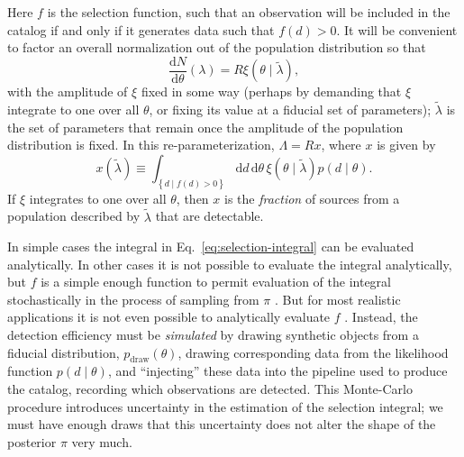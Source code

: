 \documentclass[modern]{aastex62}
\newcommand{\dd}{\mathrm{d}}
\newcommand{\diff}[2]{\frac{\dd #1}{\dd #2}}
\newcommand{\pdraw}{p_\mathrm{draw}}
\begin{document}
%
Here $f$ is the selection function, such that an observation will be included in
the catalog if and only if it generates data such that $f(d) > 0$.  It will be
convenient to factor an overall normalization out of the population distribution
so that
%
\begin{equation}
  \diff{N}{\theta}\left( \lambda \right) = R \xi\left( \theta \mid \tilde{\lambda} \right),
\end{equation}
%
with the amplitude of $\xi$ fixed in some way (perhaps by demanding that $\xi$
integrate to one over all $\theta$, or fixing its value at a fiducial set of
parameters); $\tilde{\lambda}$ is the set of parameters that remain once the
amplitude of the population distribution is fixed.  In this re-parameterization,
$\Lambda = R x$, where $x$ is given by
%
\begin{equation}
  \label{eq:selection-integral}
  x\left( \tilde{\lambda} \right) \equiv \int_{\left\{ d \mid f(d) > 0 \right\}} \dd d \, \dd \theta \, \xi\left( \theta \mid \tilde{\lambda} \right) p\left( d \mid \theta \right).
\end{equation}
%
If $\xi$ integrates to one over all $\theta$, then $x$ is the \emph{fraction} of
sources from a population described by $\tilde{\lambda}$ that are detectable.

In simple cases the integral in Eq.\ \eqref{eq:selection-integral} can be
evaluated analytically.  In other cases it is not possible to evaluate the
integral analytically, but $f$ is a simple enough function to permit evaluation
of the integral stochastically in the process of sampling from $\pi$
\citep{Mandel2018}.  But for most realistic applications it is not even possible
to analytically evaluate $f$ \citep[see
e.g.][]{Burke2015,Christainsen2015,GW150914-Rate,GW150914-Rate-Supplement,Burke2017}.
Instead, the detection efficiency must be \emph{simulated} by drawing synthetic
objects from a fiducial distribution, $\pdraw\left( \theta \right)$, drawing
corresponding data from the likelihood function $p\left( d \mid \theta \right)$,
and ``injecting'' these data into the pipeline used to produce the catalog,
recording which observations are detected.  This Monte-Carlo procedure
introduces uncertainty in the estimation of the selection integral; we must have
enough draws that this uncertainty does not alter the shape of the posterior
$\pi$ very much.
\end{document}
